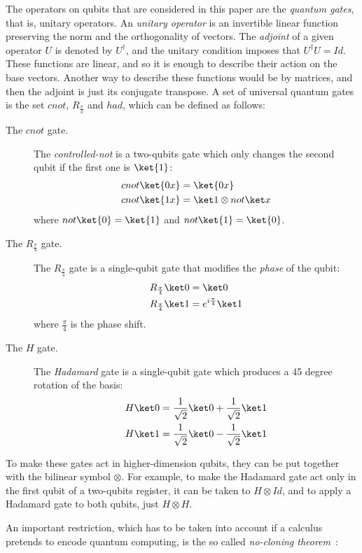 \documentclass[preprint]{elsarticle}
\begin{document}
The operators on qubits that are considered in this paper are the {\em quantum
gates}, that is, unitary operators. An {\em unitary operator} is an invertible linear
function preserving the norm and the orthogonality of vectors. The {\em adjoint}
of a given operator $U$ is denoted by $U^\dagger$, and the unitary condition
imposes that $U^\dagger U=Id$. These functions are linear, and so it is enough
to describe their action on the base vectors. Another way to describe these
functions would be by matrices, and then the adjoint is just its conjugate
transpose. A set of universal quantum gates is the set $cnot$,
$R_{\frac{\pi}{4}}$ and $had$, which can be defined as follows:
\begin{description}
\item[The $cnot$ gate.] The {\em controlled-not} is a two-qubits gate which only changes the second qubit if the first one is $\ket{1}$:
  \begin{align*}
    cnot\ket{0x} &=\ket{0x}\\
    cnot\ket{1x} &=\ket 1\otimes not\ket x
  \end{align*}
  where $not\ket{0}=\ket{1}$ and $not\ket{1}=\ket{0}$.
\item[The $R_{\frac{\pi}{4}}$ gate.] The $R_{\frac{\pi}{4}}$ gate is a
  single-qubit gate that modifies the {\em phase} of the qubit:
  \begin{align*}
    R_{\frac\pi 4}\ket 0 & = \ket 0\\
    R_{\frac\pi 4}\ket 1 & = e^{i\frac\pi 4}\ket 1
  \end{align*}
  where $\frac{\pi}{4}$ is the phase shift.
\item[The $H$ gate.] The {\em Hadamard} gate is a single-qubit gate which
  produces a 45 degree rotation of the basis:
  \begin{align*}
    H\ket 0 &=\frac 1{\sqrt 2}\ket 0+\frac 1{\sqrt 2}\ket 1\\
    H\ket 1 &=\frac 1{\sqrt 2}\ket 0-\frac 1{\sqrt 2}\ket 1
  \end{align*}
\end{description}

To make these gates act in higher-dimension qubits, they can be put together
with the bilinear symbol $\otimes$. For example, to make the Hadamard gate act
only in the first qubit of a two-qubits register, it can be taken to $H\otimes
Id$, and to apply a Hadamard gate to both qubits, just $H\otimes H$.

An important restriction, which has to be taken into account if a calculus
pretends to encode quantum computing, is the so called {\em no-cloning
  theorem}~\cite{WoottersZurekNATURE82}:
\end{document}
